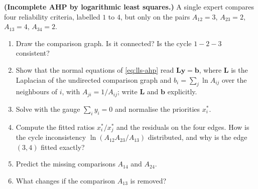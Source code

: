 \begin{prob}\label{prob:ch03:9}
\textbf{(Incomplete AHP by logarithmic least squares.)} A single expert compares four reliability criteria, labelled $1$ to $4$, but only on the pairs
$A_{12}=3$, $A_{23}=2$, $A_{13}=4$, $A_{34}=2$.
\begin{enumerate}
\item[(a)] Draw the comparison graph. Is it connected? Is the cycle $1\!-\!2\!-\!3$ consistent?
\item[(b)] Show that the normal equations of \eqref{eq:lls-ahp} read $\mathbf{L}\bm{y}=\bm{b}$, where $\mathbf{L}$ is the Laplacian of the undirected comparison graph and $b_i=\sum_{j}\ln A_{ij}$ over the neighbours of $i$, with $A_{ji}=1/A_{ij}$; write $\mathbf{L}$ and $\bm{b}$ explicitly.
\item[(c)] Solve with the gauge $\sum_i y_i=0$ and normalise the priorities $x_i^{*}$.
\item[(d)] Compute the fitted ratios $x_i^{*}/x_j^{*}$ and the residuals on the four edges. How is the cycle inconsistency $\ln(A_{12}A_{23}/A_{13})$ distributed, and why is the edge $(3,4)$ fitted exactly?
\item[(e)] Predict the missing comparisons $A_{14}$ and $A_{24}$.
\item[(f)] What changes if the comparison $A_{13}$ is removed?
\end{enumerate}
\end{prob}

